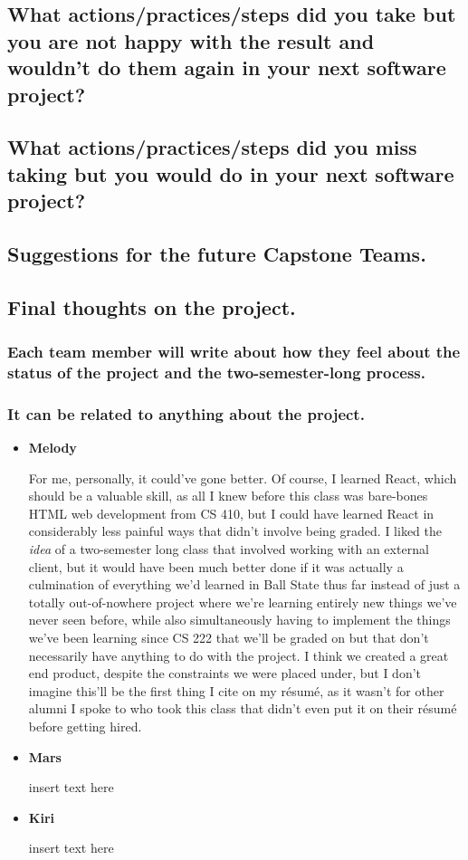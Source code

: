 \documentclass[12pt, letterpaper]{article}
\begin{document}
\subsection{What actions/practices/steps did you take but you are not happy with the result and wouldn't do them again in your next software project?}

\subsection{What actions/practices/steps did you miss taking but you would do in your next software project?}

\subsection{Suggestions for the future Capstone Teams.}

\subsection{Final thoughts on the project.}
\subsubsection{Each team member will write about how they feel about the status of the project and the two-semester-long process.}
\subsubsection{It can be related to anything about the project.}
\begin{itemize}
	\item{\textbf{Melody}}
	
		For me, personally, it could've gone better. Of course, I learned React, which should be a valuable skill, 
		as all I knew before this class was bare-bones HTML web development from CS 410, but I could have learned 
		React in considerably less painful ways that didn't involve being graded. I liked the \emph{idea} of a 
		two-semester long class that involved working with an external client, but it would have been much better 
		done if it was actually a culmination of everything we'd learned in Ball State thus far instead of just 
		a totally out-of-nowhere project where we're learning entirely new things we've never seen before, while 
		also simultaneously having to implement the things we've been learning since CS 222 that we'll be graded on but that 
		don't necessarily have anything to do with the project. I think we created a great end product, despite the 
		constraints we were placed under, but I don't imagine this'll be the first thing I cite on my résumé, as it 
		wasn't for other alumni I spoke to who took this class that didn't even put it on their résumé before getting 
		hired.
	
	\item{\textbf{Mars}}
	
		insert text here
	
	\item{\textbf{Kiri}}
	
		insert text here
\end{itemize}
\end{document}
